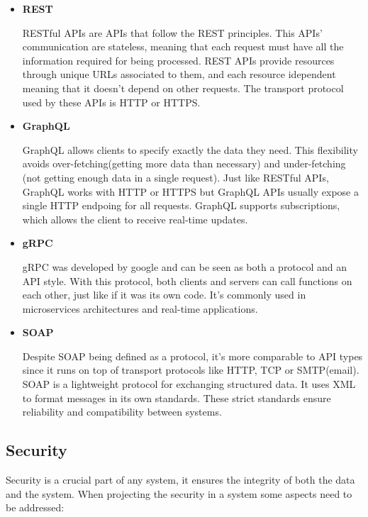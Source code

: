 \begin{itemize}
	\item \textbf{REST}

	      RESTful APIs are APIs that follow the REST principles. This APIs'
	      communication are stateless, meaning that each request must have all
	      the information required for being processed.
	      REST APIs provide resources through unique URLs associated to them, and
	      each resource idependent meaning that it doesn't depend on other
	      requests. The transport protocol used by these APIs is HTTP or HTTPS.

	\item \textbf{GraphQL}

	      GraphQL allows clients to specify exactly the data they need. This
	      flexibility avoids over-fetching(getting more data than necessary) and
	      under-fetching (not getting enough data in a single request).
	      Just like RESTful APIs, GraphQL works with HTTP or HTTPS but GraphQL APIs
	      usually expose a single HTTP endpoing for all requests.
	      GraphQL supports subscriptions, which allows the client to receive
	      real-time updates.

	\item \textbf{gRPC}

	      gRPC was developed by google and can be seen as both a protocol and an
	      API style. With this protocol, both clients and servers can call
	      functions on each other, just like if it was its own code.
	      It's commonly used in microservices architectures and real-time applications.

	\item \textbf{SOAP}

	      Despite SOAP being defined as a protocol, it's more comparable to API
	      types since it runs on top of transport protocols like HTTP, TCP or
	      SMTP(email).
	      SOAP is a lightweight protocol for exchanging structured data. It uses XML
	      to format messages in its own standards. These strict standards ensure
	      reliability and compatibility between systems.

\end{itemize}
\subsection{Security}

Security is a crucial part of any system, it ensures the integrity of both
the data and the system. When projecting the security in a system some
aspects need to be addressed:

